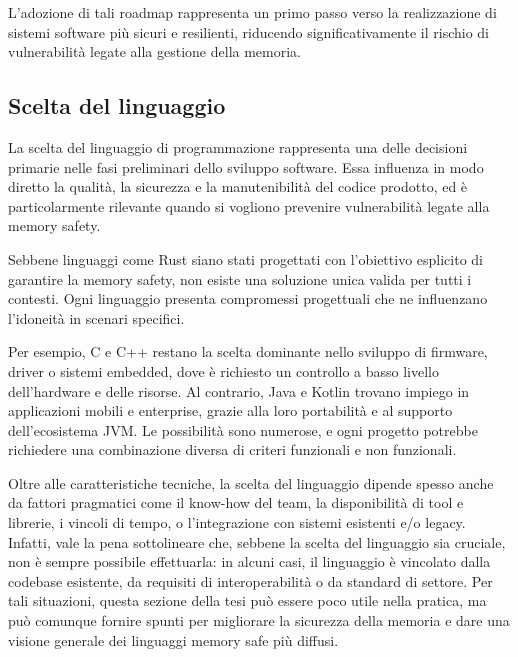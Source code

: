 L'adozione di tali roadmap rappresenta un primo passo verso la realizzazione di
sistemi software più sicuri e resilienti, riducendo significativamente il rischio
di vulnerabilità legate alla gestione della memoria.

\subsection{Scelta del linguaggio}
\label{sec:linguaggio}

La scelta del linguaggio di programmazione rappresenta una delle decisioni
primarie nelle fasi preliminari dello sviluppo software. Essa influenza in modo diretto
la qualità, la sicurezza e la manutenibilità del codice prodotto, ed è particolarmente
rilevante quando si vogliono prevenire vulnerabilità legate alla memory safety.

Sebbene linguaggi come Rust siano stati progettati con l'obiettivo esplicito di garantire
la memory safety, non esiste una soluzione unica valida per tutti i contesti. Ogni
linguaggio presenta compromessi progettuali che ne influenzano l'idoneità in scenari
specifici.

Per esempio, C e C++ restano la scelta dominante nello sviluppo di firmware, driver
o sistemi embedded, dove è richiesto un controllo a basso livello dell'hardware
e delle risorse. Al contrario, Java e Kotlin trovano impiego in applicazioni
mobili e enterprise, grazie alla loro portabilità e al supporto dell'ecosistema JVM.
Le possibilità sono numerose, e ogni progetto potrebbe richiedere una combinazione
diversa di criteri funzionali e non funzionali.

Oltre alle caratteristiche tecniche, la scelta del linguaggio dipende spesso
anche da fattori pragmatici come il know-how del team, la disponibilità di tool e
librerie, i vincoli di tempo, o l'integrazione con sistemi esistenti e/o legacy.
Infatti, vale la pena sottolineare che, sebbene la scelta del linguaggio sia
cruciale, non è sempre possibile effettuarla: in alcuni casi, il linguaggio è vincolato
dalla codebase esistente, da requisiti di interoperabilità o da standard di
settore. Per tali situazioni, questa sezione della tesi può essere poco utile
nella pratica, ma può comunque fornire spunti per migliorare la sicurezza della memoria
e dare una visione generale dei linguaggi memory safe più diffusi.

